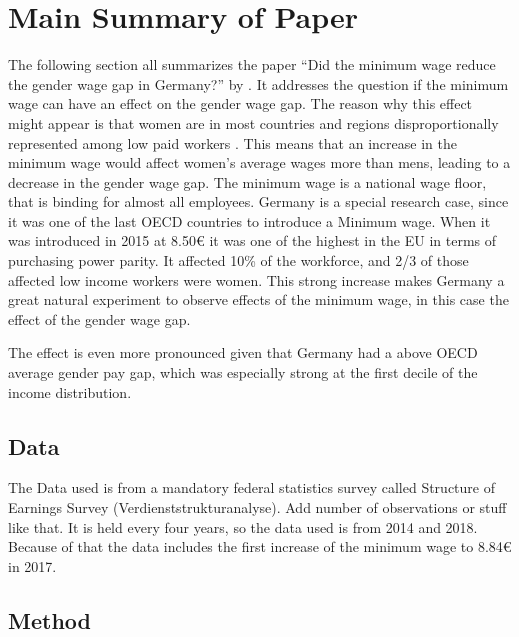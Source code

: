 \documentclass[12pt,draft,a4paper]{article}
\begin{document}
\section{Main Summary of Paper}


The following section all summarizes the paper “Did the minimum wage reduce the gender wage gap in Germany?” by \citet{CALIENDO22}. It addresses the question if the minimum wage can have an effect on the gender wage gap. 
The reason why this effect might appear is that women are in most countries and regions disproportionally represented among low paid workers \citep{kahn2015wage}.
This means that an increase in the minimum wage would affect women's average wages more than mens, leading to a decrease in the gender wage gap.
The minimum wage is a national wage floor, that is binding for almost all employees. Germany is a special research case, since it was one of the last OECD countries to introduce a Minimum wage. 
When it was introduced in 2015 at 8.50€ it was one of the highest in the EU in terms of purchasing power parity. It affected 10\% of the workforce, and 2/3 of those affected low income workers were women.  
This strong increase makes Germany a great natural experiment to observe effects of the minimum wage, in this case the effect of the gender wage gap. 

The effect is even more pronounced given that Germany had a above OECD average gender pay gap, which was especially strong at the first decile of the income distribution. 
\subsection{Data}
The Data used is from a mandatory federal statistics survey called Structure of Earnings Survey (Verdienststrukturanalyse). 
Add number of observations or stuff like that.
It is held every four years, so the data used is from 2014 and 2018. Because of that the data includes the first increase of the minimum wage to 8.84€ in 2017.


\subsection{Method}
\end{document}
